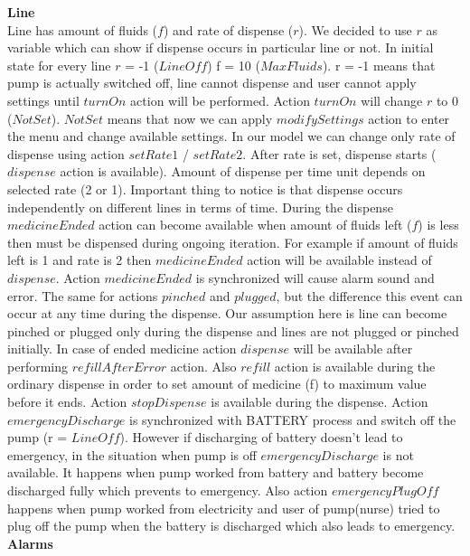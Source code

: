 \documentclass{article}
\begin{document}
\textbf{Line} \\

Line has amount of fluids ($f$) and rate of dispense ($r$). We decided to use $r$ as variable which can show if dispense occurs in particular line or not. In initial state for every line $r$ = -1 ($LineOff$) f = 10 ($MaxFluids$). r = -1 means that pump is actually switched off, line cannot dispense and user cannot apply settings until $turnOn$ action will be performed. Action $turnOn$ will change $r$ to 0 ($NotSet$). $NotSet$ means that now we can apply $modifySettings$ action to enter the menu and change available settings. In our model we can change only rate of dispense using action $setRate1$ / $setRate2$. After rate is set, dispense starts ($dispense$ action is available). Amount of dispense per time unit depends on selected rate (2 or 1). Important thing to notice is that dispense occurs independently on different lines in terms of time. During the dispense $medicineEnded$ action can become available when amount of fluids left ($f$) is less then must be dispensed during ongoing iteration. For example if amount of fluids left is 1 and rate is 2 then $medicineEnded$ action will be available instead of $dispense$. Action $medicineEnded$ is synchronized will cause alarm sound and error. The same for actions $pinched$ and $plugged$, but the difference this event can occur at any time during the dispense. Our assumption here is line can become pinched or plugged only during the dispense and lines are not plugged or pinched initially. In case of ended medicine action $dispense$ will be available after performing $refillAfterError$ action. Also $refill$ action is available during the ordinary dispense in order to set amount of medicine (f) to maximum value before it ends. Action $stopDispense$ is available during the dispense. Action $emergencyDischarge$ is synchronized with BATTERY process and switch off the pump (r = $LineOff$). However if discharging of battery doesn’t lead to emergency, in the situation when pump is off $emergencyDischarge$ is not available. It happens when pump worked from battery and battery become discharged fully which prevents to emergency. Also action $emergencyPlugOff$ happens when pump worked from electricity and user of pump(nurse) tried to plug off the pump when the battery is discharged which also leads to emergency. \\

\textbf{Alarms} \\
\end{document}
